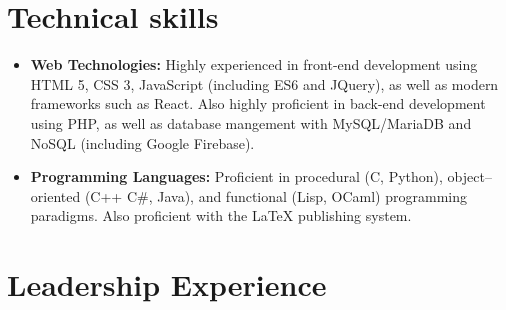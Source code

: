 \documentclass[11pt,a4paper,sans]{moderncv}
\begin{document}
\section{Technical skills}

\vspace{6pt}

\begin{itemize}

\item \textbf{Web Technologies:} Highly experienced in front-end development using HTML 5, CSS 3, JavaScript (including ES6 and JQuery), as well as modern frameworks such as React. Also highly proficient in back-end development using PHP, as well as database mangement with MySQL/MariaDB and NoSQL (including Google Firebase).
  
\vspace{6pt}
    
\item \textbf{Programming Languages:} Proficient in procedural (C, Python), object--oriented (C++ C\#, Java), and functional (Lisp, OCaml) programming paradigms. Also proficient with the LaTeX publishing system.
  
\end{itemize}

\section{Leadership Experience}

\vspace{6pt}
\end{document}
